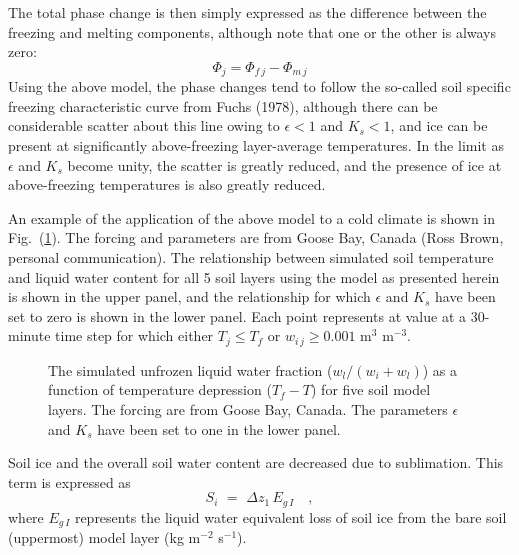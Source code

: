 The total phase change
is then simply expressed as the difference between the freezing and melting components,
although note that one or the other is always zero:
%
\begin{equation}
\Phi_j = \Phi_{f\,j} - \Phi_{m\,j}
\end{equation}
%
%
Using the above model, the phase changes tend to follow the
so-called soil specific freezing characteristic curve
from Fuchs \etal (1978), although there can be considerable scatter
about this line owing to $\epsilon < 1$ and $K_s < 1$,
and ice can be present at significantly above-freezing layer-average temperatures.
In the limit as $\epsilon$ and $K_s$ become unity, the scatter
is greatly reduced, and the presence of ice at above-freezing
temperatures is also greatly reduced.

An example of the application of the above model to
a cold climate is shown in
Fig.~(\ref{fcurv}). The forcing and parameters
are from Goose Bay, Canada (Ross Brown, personal communication).
The relationship between simulated 
soil temperature and liquid water content for all 5 soil layers
using the model as presented herein is shown in the upper panel, and the
relationship for
which $\epsilon$ and $K_s$ have been set to zero
is shown in the lower panel. Each point represents at value
at a 30-minute time step for which either $T_j \leq T_f$
or $w_{i\,j} \geq 0.001$ m$^3$ m$^{-3}$.

\begin{figure}[h]
		 \begin{center}
		 \caption{The simulated unfrozen liquid water fraction ($w_l/\left(w_i+w_l\right)$)
as a function of temperature depression ($T_f-T$) for five soil
model layers. The forcing are from Goose Bay, Canada.
The parameters $\epsilon$ and $K_s$ 
have been set to one in the lower panel.}
		 \label{fcurv}
		 \end{center}
\end{figure}

Soil ice and the overall soil water content are decreased
due to sublimation. This term is expressed as
%
\begin{equation}
\label{sublim}
S_i \,\,=\,\, \Delta z_1 \, E_{g\,I} \,\,\,
\,\,\,, 
\end{equation}
%
%
where $E_{g\,I}$ represents the liquid water equivalent loss
of soil ice from the bare soil (uppermost) model layer 
(kg m$^{-2}$ s$^{-1}$). 

